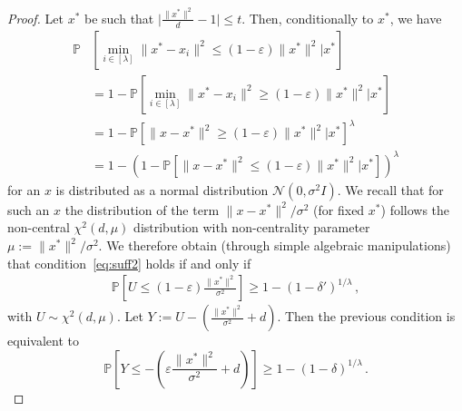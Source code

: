 \begin{proof}
Let $x^*$ be such that $\lvert\frac{\lVert x^*\rVert^2}{d}-1\rvert\leq t$. Then, conditionally to $x^*$, we have 
\begin{align*}
  \mathbb{P}&\left[\min_{i\in[\lambda]}\lVert x^*-x_i\rVert^2 \leq \left(1-\varepsilon\right)\lVert x^*\rVert^2\big| x^*\right] \\
  & = 1- \mathbb{P}\left[\min_{i\in[\lambda]}\lVert x^*-x_i\rVert^2 \geq \left(1-\varepsilon\right)\lVert x^*\rVert^2\big|x^*\right]\\
  &=1-\mathbb{P}\left[\lVert x-x^*\rVert^2 \geq \left(1-\varepsilon\right)\lVert x^*\rVert^2\big|x^*\right]^\lambda\\
  &=1-\left(1-\mathbb{P}\left[\lVert x-x^*\rVert^2 \leq \left(1-\varepsilon\right)\lVert x^*\rVert^2\big|x^*\right]\right)^\lambda
\end{align*}
for an $x$ is distributed as a normal distribution $\mathcal{N}(0,\sigma^2 I)$. We recall that for such an $x$ the distribution of the term $\lVert x-x^*\rVert^2/\sigma^2$ (for fixed $x^*$) follows the non-central $\chi^2(d,\mu)$ distribution with non-centrality parameter $\mu:=\lVert x^*\rVert^2/\sigma^2$. We therefore obtain (through simple algebraic manipulations) that condition~\eqref{eq:suff2} holds if and only if 
\begin{align*}
\mathbb{P}\left[U \leq \left(1-\varepsilon\right)\frac{\lVert x^*\rVert^2}{\sigma^2}\right]\geq1-(1-\delta')^{1/\lambda}\,,
\end{align*}
with $U \sim \chi^2(d,\mu)$. %
Let $Y  := U-\left(\frac{\lVert x^*\rVert^2}{\sigma^2}+d\right)$.
Then the previous condition is equivalent to
\begin{equation*}
    \mathbb{P}\left[Y \leq -\left(\varepsilon\frac{\lVert x^*\rVert^2}{\sigma^2}+d\right)\right]\geq1-(1-\delta)^{1/\lambda}\,.
\end{equation*}


\end{proof}
